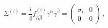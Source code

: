 \begin{equation}\label{sl}
\Sigma^{(i)}=\frac{i}{4}f^{(i)}_{\hat\alpha\hat\beta}
\gamma^{\hat\alpha}\gamma^{\hat\beta}=\left(
\begin{array}{cc}
\sigma_i&0\\
0&0
\end{array}\right)\,,
\end{equation}


